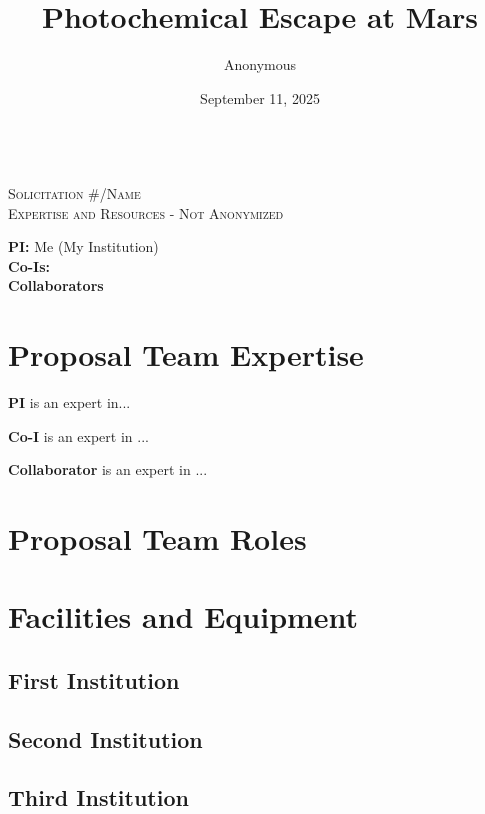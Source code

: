 \documentclass[oneside,12pt]{article}
\author{Anonymous}
\title{Photochemical Escape at Mars}
\date{September 11, 2025}
\makeatletter
\newcommand{\printtitle}{\@title}
\makeatother
\begin{document}
    \pagestyle{scrheadings}

    \begin{center}
        \textsc{\textbf{\printtitle}\\
        \bigskip
        Solicitation \#/Name\\
        \bigskip
        Expertise and Resources - Not Anonymized}
    \end{center}

    \noindent\textbf{PI:} Me (My Institution)\\
    \textbf{Co-Is:}\\
    \textbf{Collaborators}\\

    \renewcommand\contentsname{}
    \tableofcontents

    \clearpage

    \section{Proposal Team Expertise}
    \textbf{PI } is an expert in...

    \textbf{Co-I } is an expert in ...

    \textbf{Collaborator } is an expert in ...


    \section{Proposal Team Roles}

    \clearpage

    \section{Facilities and Equipment}
    \label{sec:facilities}

    \subsection{First Institution}


    \subsection{Second Institution}

    \subsection{Third Institution}

    \clearpage
\end{document}
